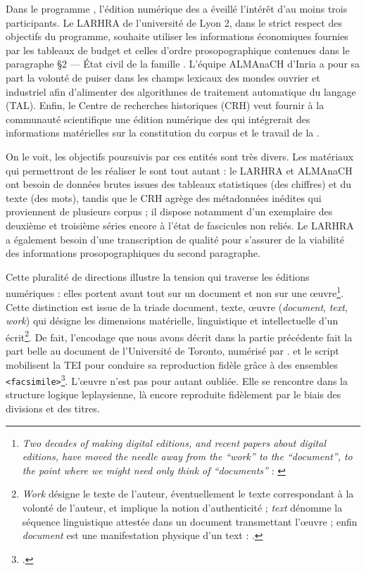 Dans le programme \timeus{}, l'édition numérique des \odm{} a éveillé l'intérêt d'au moins trois participants. Le LARHRA de l'université de Lyon 2, dans le strict respect des objectifs du programme, souhaite utiliser les informations économiques fournies par les tableaux de budget et celles d'ordre prosopographique contenues dans le paragraphe \og §2 --- État civil de la famille \fg. L'équipe ALMAnaCH d'Inria a pour sa part la volonté de puiser dans les champs lexicaux des mondes ouvrier et industriel afin d'alimenter des algorithmes de traitement automatique du langage (TAL). Enfin, le Centre de recherches historiques (CRH) veut fournir à la communauté scientifique une édition numérique des \odm{} qui intégrerait des informations matérielles sur la constitution du corpus et le travail de la \sess.

On le voit, les objectifs poursuivis par ces entités sont très divers. Les matériaux qui permettront de les réaliser le sont tout autant : le LARHRA et ALMAnaCH ont besoin de données brutes issues des tableaux statistiques (des chiffres) et du texte (des mots), tandis que le CRH agrège des métadonnées inédites qui proviennent de plusieurs corpus ; il dispose notamment d'un exemplaire des deuxième et troisième séries encore à l'état de fascicules non reliés. Le LARHRA a également besoin d'une transcription de qualité pour s'assurer de la viabilité des informations prosopographiques du second paragraphe.

Cette pluralité de directions illustre la tension qui traverse les éditions numériques : elles portent avant tout sur un document et non sur une \oe{}uvre\footnote{\og \textit{Two decades of making digital editions, and recent papers about digital editions, have moved the needle away from the “work” to the “document”, to the point where we might need only think of “documents”} \fg{} : \cite[p. 107]{robinson}}. Cette distinction est issue de la triade document, texte, \oe{}uvre (\textit{document}, \textit{text}, \textit{work}) qui désigne les dimensions matérielle, linguistique et intellectuelle d'un écrit\footnote{\og \textit{Work} désigne le texte de l’auteur, éventuellement le texte correspondant à la volonté de l’auteur, et implique la notion d’authenticité ; \textit{text} dénomme la séquence linguistique attestée dans un document transmettant l’œuvre ; enfin \textit{document} est une manifestation physique d’un text \fg{} : \cite[p. 15-16]{duval}.}. De fait, l'encodage que nous avons décrit dans la partie précédente fait la part belle au document \odm{} de l'Université de Toronto, numérisé par \ia. \transkribus{} et le script \lse{} mobilisent la TEI pour conduire sa reproduction fidèle grâce à des ensembles \texttt{<facsimile>}\footcite[p. 124]{robinson}. L'\oe{}uvre n'est pas pour autant oubliée. Elle se rencontre dans la structure logique leplaysienne, là encore reproduite fidèlement par le biais des divisions et des titres.

